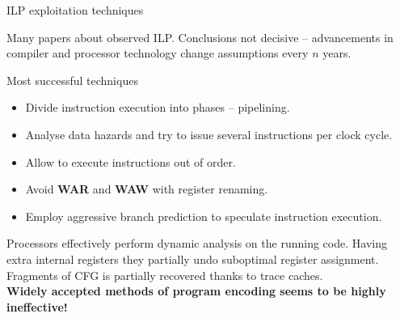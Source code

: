 \documentclass[8pt]{beamer}
\begin{document}
\begin{frame}{ILP exploitation techniques}
  \begin{alertblock}{}
    Many papers about observed ILP. Conclusions not decisive -- advancements in
    compiler and processor technology change assumptions every $n$ years.
  \end{alertblock}

  \begin{block}{Most successful techniques}
    \begin{itemize}
      \item Divide instruction execution into phases -- pipelining.
      \item Analyse data hazards and try to issue several instructions per
        clock cycle.
      \item Allow to execute instructions out of order.
      \item Avoid \textbf{WAR} and \textbf{WAW} with register renaming.
      \item Employ aggressive branch prediction to speculate instruction execution.
    \end{itemize}
  \end{block}

  \begin{alertblock}{}
    Processors effectively perform dynamic analysis on the running code. Having
    extra internal registers they partially undo suboptimal register assignment.
    Fragments of CFG is partially recovered thanks to trace caches.\\
    \vspace{1.0em}
    \textbf{Widely accepted methods of program encoding seems to be highly
      ineffective!}
  \end{alertblock}
\end{frame}
\end{document}
